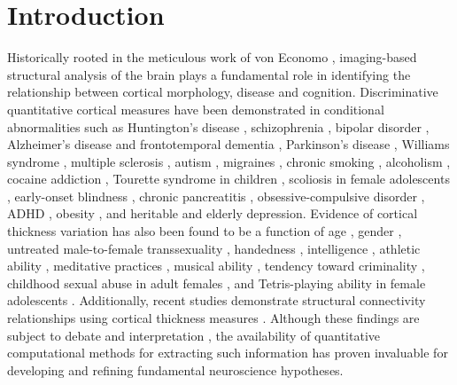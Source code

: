 \section{Introduction}

Historically rooted in the meticulous work of von Economo \citep{economo2008},
imaging-based structural analysis of the brain plays a fundamental role
in identifying the relationship between cortical morphology, disease and cognition.
Discriminative quantitative cortical measures have been demonstrated in conditional 
abnormalities such as 
Huntington's disease \citep{rosas2002,rosas2005,selemon2004}, 
schizophrenia \citep{nesvag2008}, bipolar disorder \cite{lyoo2006}, Alzheimer's disease and frontotemporal
dementia \citep{du2007,dickerson2009}, Parkinson's disease \citep{jubault2011}, Williams syndrome \citep{thompson2005},
multiple sclerosis \citep{ramasamy2009}, autism \citep{chung2005,hardan2006},
migraines \citep{dasilva2007}, chronic smoking \citep{kuhn2010}, alcoholism \citep{fortier2011},
cocaine addiction \citep{makris2008}, Tourette syndrome in children \citep{sowell2008},
scoliosis in
female adolescents \citep{wang2012}, 
early-onset blindness \citep{jiang2009},
chronic pancreatitis \citep{frokjaer2012},
obsessive-compulsive disorder \citep{shin2007}, ADHD \citep{almeida-montes2012}, obesity \citep{raji2010}, 
and heritable \citep{peterson2009}
and elderly \citep{ballmaier2004} depression.  Evidence of cortical thickness 
variation has also been found to be a function of age \citep{kochunov2011},
gender \citep{luders2006a}, untreated
male-to-female transsexuality \citep{luders2012},  handedness
\citep{luders2006,amunts2007}, intelligence \citep{shaw2006}, athletic
ability \citep{wei2011}, meditative practices \cite{lazar2005}, musical ability \citep{bermudez2009,foster2010}, 
tendency toward criminality \citep{raine2011}, 
childhood sexual abuse in adult females \citep{heim2013},
and Tetris-playing
ability in female adolescents \citep{haier2009}.  Additionally,
recent studies demonstrate structural 
connectivity relationships using cortical thickness measures
\citep{worsley2005,lerch2006,he2007,chen2008}.
Although these findings
are subject to debate and interpretation \citep{gernsbacher2007}, 
the availability of quantitative
computational methods for extracting such information
has proven invaluable for developing and refining fundamental 
neuroscience hypotheses.

